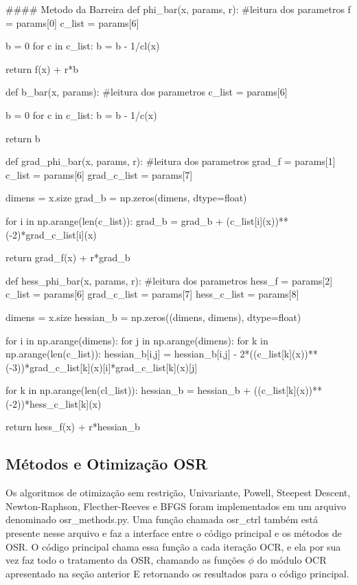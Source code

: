 \documentclass[10pt, a4paper]{article}
\begin{document}
\begin{python}
  #### Metodo da Barreira 
  def phi_bar(x, params, r):
      #leitura dos parametros
      f = params[0]
      c_list = params[6]
      
      b = 0    
      for c in c_list:
          b = b - 1/cl(x)
                  
      return f(x) + r*b

  def b_bar(x, params):
      #leitura dos parametros
      c_list = params[6]
      
      b = 0
      for c in c_list:
          b = b - 1/c(x)
              
      return b

  def grad_phi_bar(x, params, r):
      #leitura dos parametros
      grad_f = params[1]
      c_list = params[6]
      grad_c_list = params[7]
      
      dimens = x.size
      grad_b = np.zeros(dimens, dtype=float)
      
      for i in np.arange(len(c_list)):
          grad_b = grad_b + (c_list[i](x))**(-2)*grad_c_list[i](x)
              
      return grad_f(x) + r*grad_b

  def hess_phi_bar(x, params, r):
      #leitura dos parametros
      hess_f = params[2]
      c_list = params[6]
      grad_c_list = params[7]
      hess_c_list = params[8]
      
      dimens = x.size    
      hessian_b = np.zeros((dimens, dimens), dtype=float)
      
      for i in np.arange(dimens):    
          for j in np.arange(dimens):
              for k in np.arange(len(c_list)):
                  hessian_b[i,j] = hessian_b[i,j] - 2*((c_list[k](x))**(-3))*grad_c_list[k](x)[i]*grad_c_list[k](x)[j]
      
      for k in np.arange(len(cl_list)):
          hessian_b = hessian_b + ((c_list[k](x))**(-2))*hess_c_list[k](x)
      
      return hess_f(x) + r*hessian_b
\end{python}

\subsection{Métodos e Otimização OSR}

Os algoritmos de otimização sem restrição, Univariante, Powell, Steepest Descent, Newton-Raphson, Flecther-Reeves
e BFGS foram implementados em um arquivo denominado osr\_methods.py. Uma função chamada osr\_ctrl também está presente
nesse arquivo e faz a interface entre o código principal e os métodos de OSR.  O código principal chama essa função a cada iteração
OCR, e ela por sua vez faz todo o tratamento da OSR, chamando as funções $\phi$ do módulo OCR apresentado na seção anterior E
retornando os resultados para o código principal.
\end{document}
